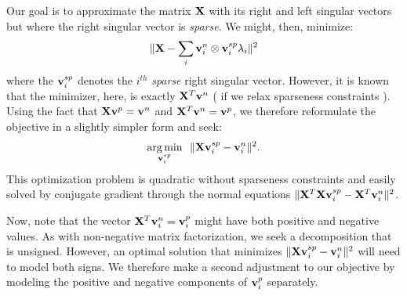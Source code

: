 \documentclass{llncs}
\newcommand{\X}{{\bf X}}
\newcommand{\vv}{{\bf v}}
\begin{document}
Our goal is to approximate the matrix $\X$ with its right and left singular vectors but where the right singular vector is {\em sparse}.  We might, then, minimize:
\begin{eqnarray}
\label{eq:recon}
\| \X  -  \sum_i \vv^n_i \otimes \vv^{sp}_i \lambda_i  \|^2
\end{eqnarray}
where the $\vv^{sp}_i$ denotes the $i^{th}$ {\em sparse} right singular vector.  However, it is known that the minimizer, here, is exactly $\X^T \vv^n$ ( if we relax sparseness constraints ).  Using the fact that $\X \vv^p = \vv^n$ and $\X^T \vv^n = \vv^p$,  we therefore reformulate the objective in a slightly simpler form and seek:
\begin{eqnarray}
\label{eq:basic}
\underset{\vv^{sp}_i}{\operatorname{arg\,min}}~~\|  \X \vv^{sp}_i - \vv_i^n \|^2 . 
\end{eqnarray}
This optimization problem is quadratic without sparseness constraints and easily solved by conjugate gradient through the normal equations $\| \X^T\X \vv^{sp}_i - \X^T\vv_i^n \|^2$.

Now, note that the vector $\X^T\vv_i^n=\vv_i^p$ might have both positive and negative values.  As with non-negative matrix factorization, we seek a decomposition that is unsigned.   However, an optimal solution that minimizes $\|  \X \vv^{sp}_i - \vv_i^n \|^2$ will need to model both signs.  We therefore make a second adjustment to our objective by modeling the positive and negative components of $\vv_i^p$ separately.
\end{document}
